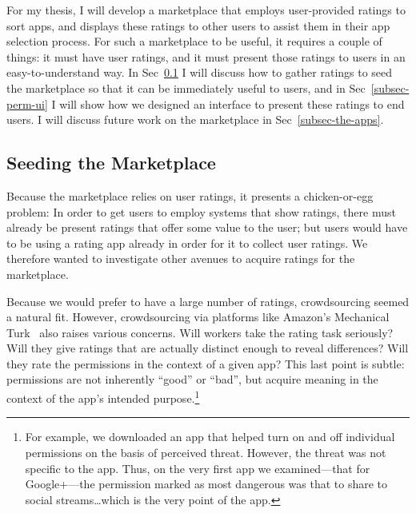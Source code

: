 \documentclass[11pt]{article}
\begin{document}
For my thesis, I will develop a marketplace that employs user-provided 
ratings to sort apps, and displays these ratings to other users 
to assist them in their app selection process. For such a marketplace
to be useful, it requires a couple of things:  it must have
user ratings, and it must present those ratings to users in
an easy-to-understand way. In Sec~\ref{subsec-seeding} I will 
discuss how to gather ratings to seed the marketplace so that 
it can be immediately useful to users, and in Sec~\ref{subsec-perm-ui}
I will show how we designed an interface to present these ratings 
to end users. I will discuss future work on the marketplace in 
Sec~\ref{subsec-the-apps}.

\subsection{Seeding the Marketplace}
\label{subsec-seeding}
Because the marketplace relies on user ratings, it presents 
a chicken-or-egg problem: In order to get users
to employ systems that show ratings, there must already be present
ratings that offer some value to the user; but users would have to be
using a rating app already in order for it to collect user
ratings. We therefore wanted to investigate other avenues to
acquire ratings for the marketplace.

Because we would prefer to have a large number of ratings,
crowdsourcing seemed a natural fit. However, crowdsourcing via
platforms like Amazon's Mechanical Turk~\cite{amazon-mturk} 
also raises various concerns. Will
workers take the rating task seriously? Will they give ratings that
are actually distinct enough to reveal differences? Will they rate the
permissions in the context of a given app? This last point is subtle: permissions are
not inherently ``good'' or ``bad'', but acquire meaning in the context
of the app's intended purpose.\footnote{For example, we
  downloaded an app that helped turn on and off individual permissions
  on the basis of perceived threat. However, the threat was not
  specific to the app. Thus, on the very first app we examined---that
  for Google+---the permission marked as most dangerous was that to
  share to social streams\dots which is the very point of the app.}
\end{document}
